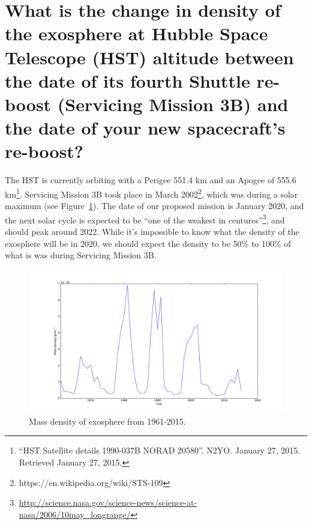 \documentclass[onecolumn,10pt]{jhwhw}
\begin{document}
\part{What is the change in density of the exosphere at Hubble Space Telescope (HST) altitude between the date of its fourth Shuttle re-boost (Servicing Mission 3B) and the date of your new spacecraft’s re-boost?}

The HST is currently orbiting with a Perigee 551.4 km and an Apogee of 555.6 km\footnote{``HST Satellite details 1990-037B NORAD 20580''. N2YO. January 27, 2015. Retrieved January 27, 2015.}. Servicing Mission 3B took place in March 2002\footnote{https://en.wikipedia.org/wiki/STS-109}, which was during a solar maximum (see Figure~\ref{fig:density}). The date of our proposed mission is January 2020, and the next solar cycle is expected to be ``one of the weakest in centures''\footnote{\url{http://science.nasa.gov/science-news/science-at-nasa/2006/10may_longrange/}}, and should peak around 2022. While it's impossible to know what the density of the exosphere will be in 2020, we should expect the density to be 50\% to 100\% of what is was during Servicing Mission 3B.

\begin{figure}[tb!]
\begin{center}
\includegraphics[width=1\textwidth]{MassDensity.pdf}
\caption{Mass density of exosphere from 1961-2015.}
\label{fig:density}
\end{center}
\end{figure}
\end{document}
